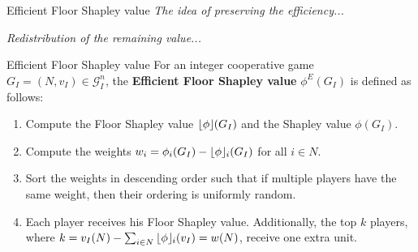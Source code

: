 \documentclass{beamer}
\newcommand{\floor}[1]{\left\lfloor #1 \right\rfloor}
\newcommand{\floorphi}{\ensuremath{\floor{\phi}\hspace{-0.5ex}}}
\begin{document}
\begin{frame}{Efficient Floor Shapley value}
    \pause
    \textit{The idea of preserving the efficiency...}

    \pause
    \textit{Redistribution of the remaining value...}

    \pause

    \begin{block}{Efficient Floor Shapley value}
        \pause
        For an integer cooperative game $G_I=(N,v_I) \in \mathcal{G}_I^n$, the \textbf{Efficient Floor Shapley value} $\phi^E(G_I)$ is defined as follows:
        \begin{enumerate}
            \pause
            \item Compute the Floor Shapley value $\floorphi(G_I)$ and the Shapley value $\phi(G_I)$.
            \pause
            \item Compute the weights $w_i = \phi_i(G_I) - \floorphi_i(G_I)$ for all $i \in N$.
            \pause
            \item Sort the weights in descending order such that if multiple players have the same weight, then their ordering is uniformly random.
            \pause
            \item Each player receives his Floor Shapley value. Additionally, the top $k$ players, where $k = v_I(N) - \sum_{i \in N} \floorphi_i(v_I) = w(N)$, receive one extra unit.
        \end{enumerate}
    \end{block}
\end{frame}


\end{document}
